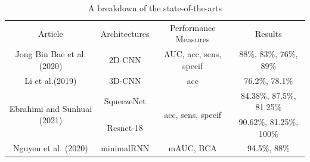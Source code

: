 \documentclass[a4paper, 12pt]{article}
\begin{document}
\begin{table}[htbp]
    \centering
    \footnotesize
    \begin{tabular}{cccc}
        \toprule
        \multirow{2}{*}{Article}                     & \multirow{2}{*}{Architectures} & \multirow{2}{*}{Performance Measures} & \multirow{2}{*}{Results}        \\
                                                     &                                &                                       &                                 \\
        \midrule
        Jong Bin Bae et al.(2020)                    & 2D-CNN                         & AUC, acc, sens, specif                & \tiny{88\%, 83\%, 76\%, 89\%}   \\
        \midrule
        Li et al.(2019)                              & 3D-CNN                         & acc                                   & \footnotesize{76.2\%, 78.1\%}   \\
        \midrule
        \multirow{2}{*}{Ebrahimi and Sunhuai (2021)} & SqueezeNet                     & \multirow{2}{*}{acc, sens, specif}    & \tiny{84.38\%, 87.5\%, 81.25\%} \\
                                                     & Resnet-18                      &                                       & \tiny{90.62\%, 81.25\%, 100\%}  \\
        \midrule
        Nguyen et al. (2020)                         & minimalRNN                     & mAUC, BCA                             & \footnotesize{94.5\%, 88\%}     \\
        \bottomrule
    \end{tabular}
    \caption{A breakdown of the state-of-the-arts}
    \label{tab:mytable}
\end{table}

\end{document}

